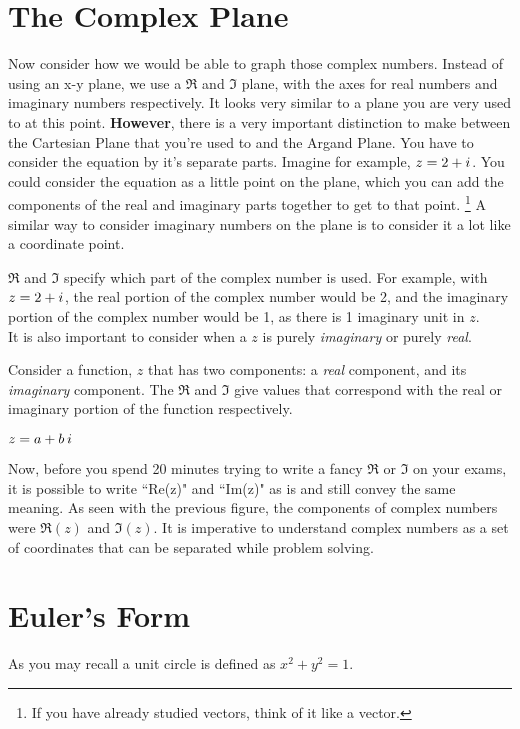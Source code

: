 \documentclass[../main.tex]{subfiles}
\begin{document}
\section{The Complex Plane}

Now consider how we would be able to graph those complex numbers. Instead of using an x-y plane, we use a $\Re$ and $\Im$ plane, with the axes for real numbers and imaginary numbers respectively. It looks very similar to a plane you are very used to at this point.
\textbf{However}, there is a very important distinction to make between the Cartesian Plane that you're used to and the Argand Plane. You have to consider the equation by it's separate parts. Imagine for example, $z=2+{i\mkern1mu}$. You could consider the equation as a little point on the plane, which you can add the components of the real and imaginary parts together to get to that point.
\footnote{If you have already studied vectors, think of it like a vector.} 
A similar way to consider imaginary numbers on the plane is to consider it a lot like a coordinate point.\\
\begin{center}
\end{center}
$\Re$ and $\Im$ specify which part of the complex number is used. For example, with $z=2+{i\mkern1mu}$, the real portion of the complex number would be 2, and the imaginary portion of the complex number would be 1, as there is 1 imaginary unit in $z$.\\
It is also important to consider when a $z$ is purely \textsl{imaginary} or purely \textsl{real}.
\begin{tcolorbox}[
		floatplacement=t,
		float,
		colframe = keyIdea,
		title= $\Re$ and $\Im$]
		{
			Consider a function, $z$ that has two components: a \textsl{real} component, and its \textsl{imaginary} component. The $\Re$ and $\Im$ give values that correspond with the real or imaginary portion of the function respectively.\\
			\hspace{1.3em}
			\begin{center}
				$z= a+b\hspace{0.2em}{i\mkern1mu}$\\
				\color{purple}{$\therefore \Re(z) = a$; $\Im(z)= b$}
			\end{center}
		}
	\end{tcolorbox}
Now, before you spend 20 minutes trying to write a fancy $\Re$ or $\Im$ on your exams, it is possible to write ``Re(z)" and ``Im(z)" as is and still convey the same meaning. As seen with the previous figure, the components of complex  numbers were $\Re(z)$ and $\Im(z)$. It is imperative to understand complex numbers as a set of coordinates that can be separated while problem solving.
\newpage
\section{Euler's Form}
{}
As you may recall a unit circle is defined as $x^2 + y^2 = 1$. 
\end{document}
